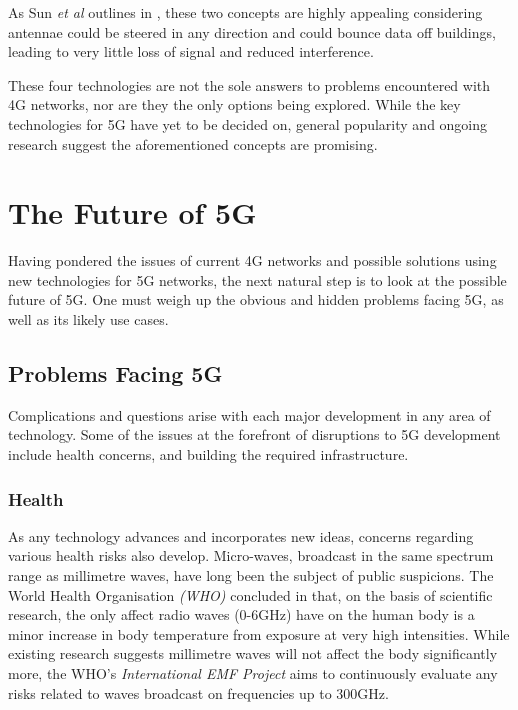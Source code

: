 \documentclass[journal]{IEEEtran}
\begin{document}
As Sun \textit{et al} outlines in \cite{beam_sm}, these two concepts are highly appealing considering antennae could be steered in any direction and could bounce data off buildings, leading to very little loss of signal and reduced interference.
\bigskip

These four technologies are not the sole answers to problems encountered with 4G networks, nor are they the only options being explored. While the key technologies for 5G have yet to be decided on, general popularity and ongoing research suggest the aforementioned concepts are promising.

\section{The Future of 5G}
Having pondered the issues of current 4G networks and possible solutions using new technologies for 5G networks, the next natural step is to look at the possible future of 5G. One must weigh up the obvious and hidden problems facing 5G, as well as its likely use cases.

\subsection{Problems Facing 5G}
Complications and questions arise with each major development in any area of technology. Some of the issues at the forefront of disruptions to 5G development include health concerns, and building the required infrastructure.


\subsubsection{Health}
As any technology advances and incorporates new ideas, concerns regarding various health risks also develop. Micro-waves, broadcast in the same spectrum range as millimetre waves, have long been the subject of public suspicions. The World Health Organisation \textit{(WHO)} concluded in \cite{health} that, on the basis of scientific research, the only affect radio waves (0-6GHz) have on the human body is a minor increase in body temperature from exposure at very high intensities. While existing research suggests millimetre waves will not affect the body significantly more, the WHO's \textit{International EMF Project} \cite{emfproj} aims to continuously evaluate any risks related to waves broadcast on frequencies up to 300GHz.

\end{document}

